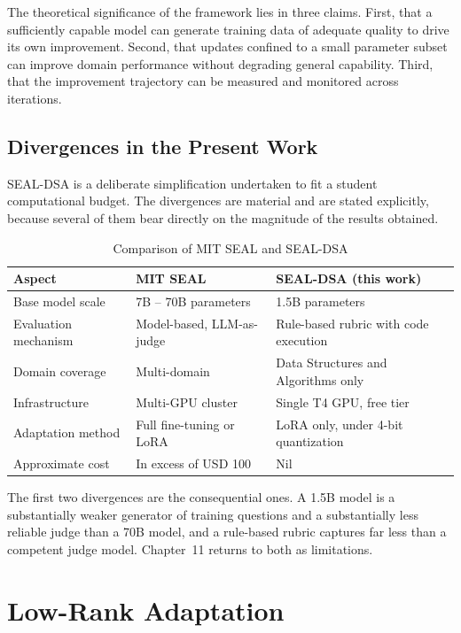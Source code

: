 \documentclass[12pt,a4paper]{report}
\begin{document}
The theoretical significance of the framework lies in three claims. First, that a sufficiently capable model can generate training data of adequate quality to drive its own improvement. Second, that updates confined to a small parameter subset can improve domain performance without degrading general capability. Third, that the improvement trajectory can be measured and monitored across iterations.

\subsection{Divergences in the Present Work}

SEAL-DSA is a deliberate simplification undertaken to fit a student computational budget. The divergences are material and are stated explicitly, because several of them bear directly on the magnitude of the results obtained.

\begin{table}[htbp]
\centering
\caption{Comparison of MIT SEAL and SEAL-DSA}
\begin{tabular}{>{\raggedright\arraybackslash}p{3.5cm} p{5cm} p{5cm}}
\toprule
\textbf{Aspect} & \textbf{MIT SEAL} & \textbf{SEAL-DSA (this work)} \\
\midrule
Base model scale & 7B -- 70B parameters & 1.5B parameters \\
Evaluation mechanism & Model-based, LLM-as-judge & Rule-based rubric with code execution \\
Domain coverage & Multi-domain & Data Structures and Algorithms only \\
Infrastructure & Multi-GPU cluster & Single T4 GPU, free tier \\
Adaptation method & Full fine-tuning or LoRA & LoRA only, under 4-bit quantization \\
Approximate cost & In excess of USD 100 & Nil \\
\bottomrule
\end{tabular}
\end{table}

The first two divergences are the consequential ones. A 1.5B model is a substantially weaker generator of training questions and a substantially less reliable judge than a 70B model, and a rule-based rubric captures far less than a competent judge model. Chapter~11 returns to both as limitations.

\section{Low-Rank Adaptation}
\end{document}
